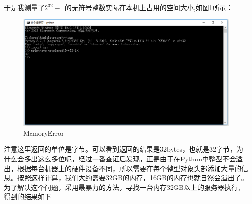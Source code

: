 \documentclass[UTF8]{ctexart}
\begin{document}
于是我测量了$2^{32}-1$的无符号整数实际在本机上占用的空间大小,如图\ref{size}所示：

\begin{figure}[H]
    \centering
    \includegraphics[width=1\textwidth]{img/size.png}
    \caption{MemoryError}
    \label{size}
\end{figure}

注意这里返回的单位是字节。可以看到返回的结果是32bytes，也就是32字节，为什么会多出这么多位呢，经过一番查证后发现，正是由于在Python中整型不会溢出，根据每台机器上的硬件设备不同，所以需要在每个整型对象头部添加大量的信息。按照这样计算，我们大约需要32GB的内存，16GB的内存也就自然会溢出了。\\

为了解决这个问题，采用最暴力的方法，寻找一台内存32GB以上的服务器执行，得到的结果如下
\end{document}
